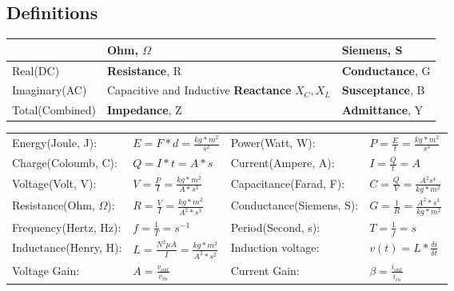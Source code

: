 \subsection{Definitions}
\begin{tabular}{| l | l | l |}
\hline
& Ohm, $\Omega$ & Siemens, S \\ \hline
Real(DC) & \textbf{Resistance}, R & \textbf{Conductance}, G \\
\hline
Imaginary(AC) & Capacitive and Inductive \textbf{Reactance} $X_C, X_L$ 
& \textbf{Susceptance}, B \\ 
\hline
Total(Combined)& \textbf{Impedance}, Z & \textbf{Admittance}, Y \\ 
\hline
\end{tabular}
\newline
\noindent
\begin{tabularx}{\textwidth}{@{} 
p{} 
p{} 
p{} 
p{} @{}}
Energy(Joule, J):           & $ E = F * d = \frac{kg*m^2}{s^2}$
& Power(Watt, W):           & $ P = \frac{E}{t} = \frac{kg*m^2}{s^3}$\\
Charge(Coloumb, C):         & $ Q = I * t = A*s $
& Current(Ampere, A):       & $ I = \frac{Q}{t} = A$\\
Voltage(Volt, V):           & $ V = \frac{P}{I} = \frac{kg*m^2}{A*s^3}$
& Capacitance(Farad, F):    & $ C = \frac{Q}{V} = \frac{A^2s^4}{kg*m^2}$\\
Resistance(Ohm, $\Omega$):  & $ R = \frac{V}{I} = \frac{kg*m^2}{A^2*s^3}$
& Conductance(Siemens, S):  & $ G = \frac{1}{R} = \frac{A^2*s^3}{kg*m^2}$\\
Frequency(Hertz, Hz):       & $ f = \frac{1}{T} = s^{-1}$
& Period(Second, s):        & $ T = \frac{1}{f} = s$\\
Inductance(Henry, H):       & $ L = \frac{N^2 \mu A}{I} = \frac{kg*m^2}{A^2*s^2}$
& Induction voltage:        & $ v(t) = L*\frac{\delta i}{\delta t} $\\
Voltage Gain:               & $ A = \frac{v_{out}}{v_{in}}$
& Current Gain:             & $ \beta = \frac{i_{out}}{i_{in}} $ 
\end{tabularx}

